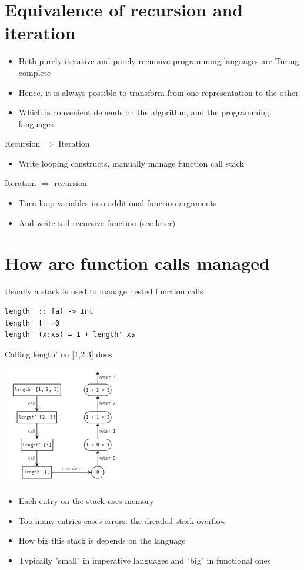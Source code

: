\documentclass{article}[18pt]
\begin{document}
\section{Equivalence of recursion and iteration}
\begin{itemize}
	\item Both purely iterative and purely recursive programming languages are Turing complete
	\item Hence, it is always possible to transform from one representation to the other
	\item Which is convenient depends on the algorithm, and the programming languages
\end{itemize}
Recursion $\Rightarrow$ Iteration
\begin{itemize}
	\item Write looping constructs, manually manage function call stack
\end{itemize}
Iteration $\Rightarrow$ recursion
\begin{itemize}
	\item Turn loop variables into additional function arguments
	\item And write tail recursive function (see later)
\end{itemize}
\section{How are function calls managed}
Usually a stack is used to manage nested function calls
\begin{verbatim}
length' :: [a] -> Int
length' [] =0
length' (x:xs) = 1 + length' xs
\end{verbatim}
Calling length' on [1,2,3] does:
\begin{center}
	\includegraphics[scale=1]{"Function Calls"}
\end{center}
\begin{itemize}
	\item Each entry on the stack uses memory
	\item Too many entries cases errors: the dreaded stack overflow
	\item How big this stack is depends on the language
	\item Typically "small" in imperative languages and "big" in functional ones
\end{itemize}
\end{document}
